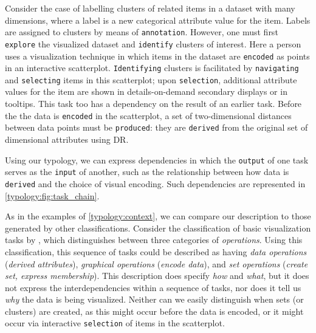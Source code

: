 Consider the case of labelling clusters of related items in a dataset with many dimensions, where a label is a new categorical attribute value for the item.
Labels are assigned to clusters by means of {\tt annotation}.
However, one must first {\tt explore} the visualized dataset and {\tt identify} clusters of interest.
Here a person uses a visualization technique in which items in the dataset are {\tt encoded} as points in an interactive scatterplot.
{\tt Identifying} clusters is facilitated by {\tt navigating} and {\tt selecting} items in this scatterplot; upon {\tt selection}, additional attribute values for the item are shown in details-on-demand secondary displays or in tooltips.
This task too has a dependency on the result of an earlier task.
Before the the data is {\tt encoded} in the scatterplot, a set of two-dimensional distances between data points must be {\tt produced}:     they are {\tt derived} from the original set of dimensional attributes using \ac{DR}.

Using our typology, we can express dependencies in which the {\tt output} of one task serves as the {\tt input} of another, such as the relationship between how data is {\tt derived} and the choice of visual encoding.
Such dependencies are represented in \autoref{typology:fig:task_chain}.

As in the examples of \autoref{typology:context}, we can compare our description to those generated by other classifications.
Consider the classification of basic visualization tasks by \citet{Chuah1996}, which distinguishes between three categories of {\it operations}.
Using this classification, this sequence of tasks could be described as having {\it data operations} ({\it derived attributes}), {\it graphical operations} ({\it encode data}), and {\it set operations} ({\it create set, express membership}).
This description does specify {\it how} and {\it what}, but it does not express the interdependencies within a sequence of tasks, nor does it tell us {\it why} the data is being visualized.
Neither can we easily distinguish when sets (or clusters) are created, as this might occur before the data is encoded, or it might occur via interactive {\tt selection} of items in the scatterplot.

